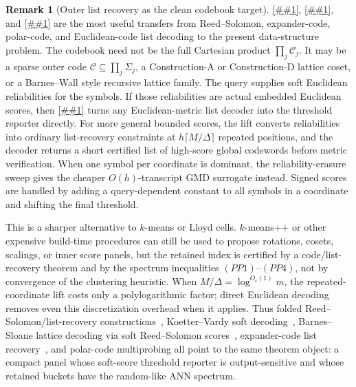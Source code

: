\documentclass[10pt]{article}
\newcommand{\cref}[1]{\ref{##1}}
\newcommand{\Cref}[1]{\ref{##1}}
\theoremstyle{definition}
\newtheorem{remark}[theorem]{Remark}
\begin{document}
\begin{remark}[Outer list recovery as the clean codebook target]
   \label{rem:outer-list-recovery-codebook}
   \Cref{cor:euclidean-list-decoder-reporter},
   \cref{lem:hard-list-recovery-lift}, and
   \cref{lem:reliability-erasure-sweep} are the most useful transfers from
   Reed--Solomon, expander-code, polar-code, and Euclidean-code list decoding
   to the present data-structure problem.  The codebook need not be the full
   Cartesian product
   \(\prod_j\mathcal C_j\).  It may be a sparse outer code
   \(\mathcal C\subseteq\prod_j\Sigma_j\), a Construction-A or Construction-D
   lattice coset, or a Barnes--Wall style recursive lattice family.  The query
   supplies soft Euclidean reliabilities for the symbols.  If those
   reliabilities are actual embedded Euclidean scores, then
   \cref{cor:euclidean-list-decoder-reporter} turns any Euclidean-metric list
   decoder into the threshold reporter directly.  For more general bounded
   scores, the lift converts reliabilities into ordinary list-recovery
   constraints at \(h\lceil M/\Delta\rceil\) repeated positions, and the
   decoder returns a short certified list of high-score global codewords before
   metric verification.  When one symbol per coordinate is dominant, the
   reliability-erasure sweep gives the cheaper \(O(h)\)-transcript GMD
   surrogate instead.  Signed scores are handled by adding a query-dependent
   constant to all symbols in a coordinate and shifting the final threshold.

   This is a sharper alternative to \(k\)-means or Lloyd cells.  \(k\)-means++
   or other expensive build-time procedures can still be used to propose
   rotations, cosets, scalings, or inner score panels, but the retained index is
   certified by a code/list-recovery theorem and by the spectrum inequalities
   \((PP1)\)--\((PP4)\), not by convergence of the clustering heuristic.  When
   \(M/\Delta=\log^{O_c(1)}m\), the repeated-coordinate lift costs only a
   polylogarithmic factor; direct Euclidean decoding removes even this
   discretization overhead when it applies.  Thus folded Reed--Solomon/list-recovery
   constructions~\cite{GR08}, Koetter--Vardy soft decoding~\cite{KV03},
   Barnes--Sloane lattice decoding via soft Reed--Solomon scores~\cite{MP20},
   expander-code list recovery~\cite{ST25}, and polar-code multiprobing
   \cite{TV12,TH23} all point to the same theorem object: a compact panel whose
   soft-score threshold reporter is output-sensitive and whose retained buckets
   have the random-like ANN spectrum.
\end{remark}
\end{document}
